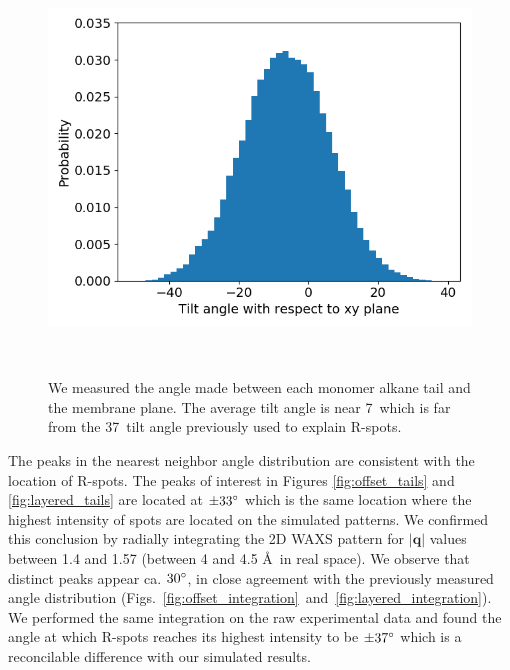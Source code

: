 \documentclass{article}
\begin{document}
  \begin{figure}
  \centering
  \includegraphics[width=0.5\linewidth]{tilt_dist.png}
  \caption{We measured the angle made between each monomer alkane tail and the membrane plane. 
  The average tilt angle is near 7\degree~which is far from the 37\degree~tilt angle 
  previously used to explain R-spots.}~\label{fig:tilt}
  \end{figure}

  The peaks in the nearest neighbor angle distribution are consistent with the
  location of R-spots. The peaks of interest in Figures \ref{fig:offset_tails}
  and \ref{fig:layered_tails} are located at $\pm 33 \degree$ which is the same
  location where the highest intensity of spots are located on the simulated
  patterns. We confirmed this conclusion by radially integrating the 2D WAXS
  pattern for $\left|\mathbf{q}\right|$ values between 1.4 and 1.57 (between 4
  and 4.5 \AA~in real space). We observe that distinct peaks appear ca. $30
  \degree$, in close agreement with the previously measured angle distribution
  (Figs.~\ref{fig:offset_integration}~and~\ref{fig:layered_integration}). We
  performed the same integration on the raw experimental data and found the angle
  at which R-spots reaches its highest intensity to be $\pm 37 \degree$ which
  is a reconcilable difference with our simulated results.  
\end{document}
